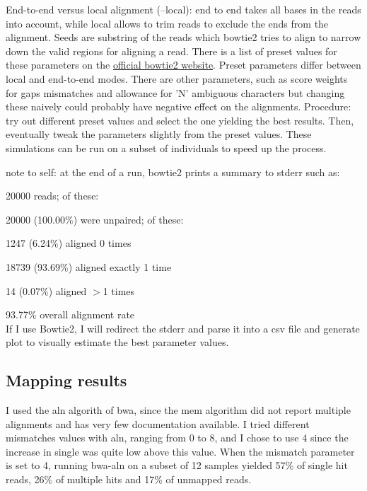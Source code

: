 \documentclass[10pt,a4paper]{report}
\begin{document}
End-to-end versus local alignment (--local): end to end takes all bases in the reads into account, while local allows to trim reads to exclude the ends from the alignment.
Seeds are substring of the reads which bowtie2 tries to align to narrow down the valid regions for aligning a read. There is a list of preset values for these parameters on the \href{http://bowtie-bio.sourceforge.net/bowtie2/manual.shtml#preset-options-in---end-to-end-mode}{official bowtie2 website}. Preset parameters differ between local and end-to-end modes.
There are other parameters, such as score weights for gaps mismatches and allowance for 'N' ambiguous characters but changing these naively could probably have negative effect on the alignments.
Procedure: try out different preset values and select the one yielding the best results. Then, eventually tweak the parameters slightly from the preset values. These simulations can be run on a subset of individuals to speed up the process.

note to self: at the end of a run, bowtie2 prints a summary to stderr such as:

20000 reads; of these:

  20000 (100.00\%) were unpaired; of these:
  
    1247 (6.24\%) aligned 0 times
    
    18739 (93.69\%) aligned exactly 1 time
    
    14 (0.07\%) aligned $>$1 times
    
93.77\% overall alignment rate
\vspace{10px}\\
If I use Bowtie2, I will redirect the stderr and parse it into a csv file and generate plot to visually estimate the best parameter values.

\subsection{Mapping results}

I used the aln algorith of bwa, since the mem algorithm did not report multiple alignments and has very few documentation available. I tried different mismatches values with aln, ranging from 0 to 8, and I chose to use 4 since the increase in single was quite low above this value. When the mismatch parameter is set to 4, running bwa-aln on a subset of 12 samples yielded 57\% of single hit reads, 26\% of multiple hits and 17\% of unmapped reads.
\end{document}
